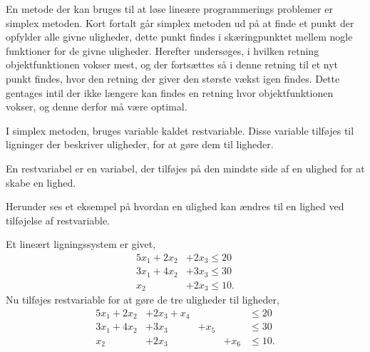 En metode der kan bruges til at løse lineære programmerings problemer er simplex metoden. Kort fortalt går simplex metoden ud på at finde et punkt der opfylder alle givne uligheder, dette punkt findes i skæringpunktet mellem nogle funktioner for de givne uligheder. Herefter undersøges, i hvilken retning objektfunktionen vokser mest, og der fortsættes så i denne retning til et nyt punkt findes, hvor den retning der giver den største vækst igen findes. Dette gentages intil der ikke længere kan findes en retning hvor objektfunktionen vokser, og denne derfor må være optimal. 

I simplex metoden, bruges variable kaldet restvariable. Disse variable tilføjes til ligninger der beskriver uligheder, for at gøre dem til ligheder. 
\begin{defn}[Restvariable]
En restvariabel er en variabel, der tilføjes på den mindste side af en ulighed for at skabe en lighed. 
\end{defn}

Herunder ses et eksempel på hvordan en ulighed kan ændres til en lighed ved tilføjelse af restvariable.

\begin{eks}
Et lineært ligningssystem er givet,
\begin{align*}
5 x_1 + 2 x_2 &+ 2x_3 \leq 20 \\
3 x_1 + 4 x_2 &+ 3 x_3 \leq 30 \\
x_2 &+ 2 x_3 \leq 10.
\end{align*}
Nu tilføjes restvariable for at gøre de tre uligheder til ligheder,
\begin{align*}
5 x_1 + 2 x_2 &+ 2x_3 + x_4& &&\leq 20 \\
3 x_1 + 4 x_2 &+ 3 x_3 &+ x_5& &\leq 30 \\
x_2 &+ 2 x_3 & &+x_6 &\leq 10.
\end{align*}

\end{eks}